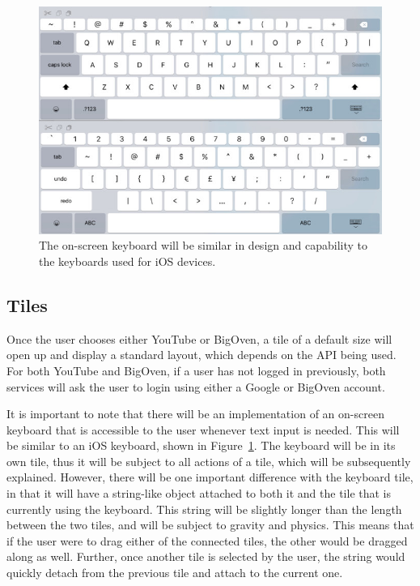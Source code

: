 \documentclass[fleqn,10pt]{wlpeerj}
\begin{document}
\begin{figure}[ht]
\centering
\includegraphics[width=\linewidth]{iOSkeyboard.jpg}
\caption{The on-screen keyboard will be similar in design and capability to the keyboards used for iOS devices.}
\label{fig:iOSkeyboard}
\end{figure}

\subsection*{Tiles}
Once the user chooses either YouTube or BigOven, a tile of a default size will open up and display a standard layout, which depends on the API being used. For both YouTube and BigOven, if a user has not logged in previously, both services will ask the user to login using either a Google or BigOven account.

It is important to note that there will be an implementation of an on-screen keyboard that is accessible to the user whenever text input is needed. This will be similar to an iOS keyboard, shown in Figure~\ref{fig:iOSkeyboard}. The keyboard will be in its own tile, thus it will be subject to all actions of a tile, which will be subsequently explained. However, there will be one important difference with the keyboard tile, in that it will have a string-like object attached to both it and the tile that is currently using the keyboard. This string will be slightly longer than the length between the two tiles, and will be subject to gravity and physics. This means that if the user were to drag either of the connected tiles, the other would be dragged along as well. Further, once another tile is selected by the user, the string would quickly detach from the previous tile and attach to the current one.
\end{document}

